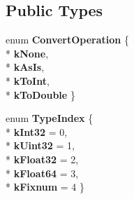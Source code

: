 \subsection*{Public Types}
\begin{DoxyCompactItemize}
\item 
enum {\bfseries Convert\+Operation} \{ \\*
{\bfseries k\+None}, 
\\*
{\bfseries k\+As\+Is}, 
\\*
{\bfseries k\+To\+Int}, 
\\*
{\bfseries k\+To\+Double}
 \}\hypertarget{classv8_1_1internal_1_1wasm_1_1_asm_wasm_builder_impl_a1eac4240d8bd7634145a0caf53911bbb}{}\label{classv8_1_1internal_1_1wasm_1_1_asm_wasm_builder_impl_a1eac4240d8bd7634145a0caf53911bbb}

\item 
enum {\bfseries Type\+Index} \{ \\*
{\bfseries k\+Int32} = 0, 
\\*
{\bfseries k\+Uint32} = 1, 
\\*
{\bfseries k\+Float32} = 2, 
\\*
{\bfseries k\+Float64} = 3, 
\\*
{\bfseries k\+Fixnum} = 4
 \}\hypertarget{classv8_1_1internal_1_1wasm_1_1_asm_wasm_builder_impl_a2e16aa2df24f630721b32846b859561a}{}\label{classv8_1_1internal_1_1wasm_1_1_asm_wasm_builder_impl_a2e16aa2df24f630721b32846b859561a}

\end{DoxyCompactItemize}
